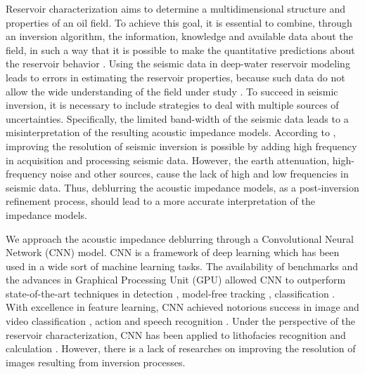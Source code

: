 \documentclass[conference]{IEEEtran}
\begin{document}
Reservoir characterization aims to determine a multidimensional
structure and properties of an oil field. To achieve this goal, it is essential to combine, through an
inversion algorithm, the information, knowledge and available data about the field,
in such a way that it is possible to make the
quantitative predictions about the reservoir behavior \cite{buiting}.
Using the seismic data in deep-water reservoir modeling leads to errors in estimating
the reservoir properties, because such data do not allow the wide understanding of the field
under study \cite{Sergio2016}.
To succeed in seismic inversion, it is necessary to include strategies to deal with multiple
sources of uncertainties. Specifically, the limited band-width of the seismic data leads to
a misinterpretation of the resulting acoustic impedance models.
According to \cite{xiaoiu}, improving the resolution of seismic inversion is
possible by adding high frequency in acquisition and processing seismic data.
However, the earth attenuation, high-frequency noise and other sources, cause
the lack of high and low frequencies in seismic data. 
Thus, deblurring the acoustic impedance models, as a post-inversion refinement process, should lead to a more accurate
interpretation of the impedance models.

We approach the acoustic impedance deblurring through
a Convolutional Neural Network (CNN) model. CNN is a framework of deep learning which has been
used in a wide sort of machine learning tasks. The availability of benchmarks
\cite{Russakovsky} and the advances in Graphical Processing Unit (GPU) \cite{Buduma15}
allowed CNN to outperform state-of-the-art techniques in detection \cite{Girshick2015,Bell2015}, model-free
tracking \cite{Nam}, classification \cite{He2016}. With excellence in feature learning,
CNN achieved notorious success in image and video classification \cite{Krizhevsky2012, AbdelHamid2014}, action  and speech recognition \cite{Farfade2015, S_Ji2013}.
Under the perspective of the reservoir characterization, CNN has been applied to lithofacies recognition
\cite{Qian} and calculation \cite{Liu2017}. However, there is a lack of researches on improving the resolution of
images resulting from inversion processes.
\end{document}

